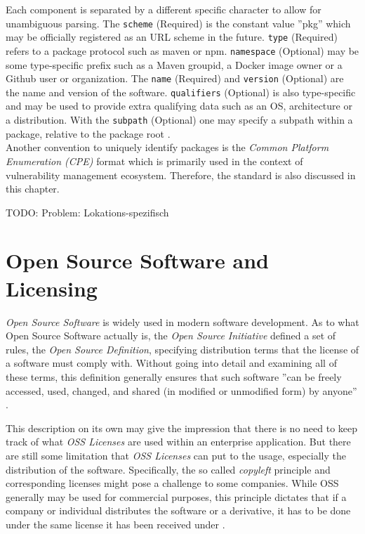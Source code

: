 Each component is separated by a different specific character to allow for unambiguous parsing. The \lstinline|scheme| (Required) is the constant value ''pkg'' which may be officially registered as an URL scheme in the future. \lstinline|type| (Required) refers to a package protocol such as maven or npm. \lstinline|namespace| (Optional) may be some type-specific prefix such as a Maven groupid, a Docker image owner or a Github user or organization. The \lstinline|name| (Required) and \lstinline|version| (Optional) are the name and version of the software. \lstinline|qualifiers| (Optional) is also type-specific and may be used to provide extra qualifying data such as an OS, architecture or a distribution. With the \lstinline|subpath| (Optional) one may specify a subpath within a package, relative to the package root \cite{purl}.\\

Another convention to uniquely identify packages is the \textit{Common Platform Enumeration (CPE)} format which is primarily used in the context of vulnerability management ecosystem. Therefore, the standard is also discussed in this chapter.

TODO: Problem: Lokations-spezifisch 

\section{Open Source Software and Licensing}
\textit{Open Source Software} is widely used in modern software development. As to what Open Source Software actually is, the \textit{Open Source Initiative} defined a set of rules, the \textit{Open Source Definition}, specifying distribution terms that the license of a software must comply with. Without going into detail and examining all of these terms, this definition generally ensures that such software ''can be freely accessed, used, changed, and shared (in modified or unmodified form) by anyone'' \cite{OSI}.\par
This description on its own may give the impression that there is no need to keep track of what \textit{OSS Licenses} are used within an enterprise application. But there are still some limitation that \textit{OSS Licenses} can put to the usage, especially the distribution of the software. Specifically, the so called \textit{copyleft} principle and corresponding licenses might pose a challenge to some companies. While OSS generally may be used for commercial purposes, this principle dictates that if a company or individual distributes the software or a derivative, it has to be done under the same license it has been received under \cite{OSI}.\\

